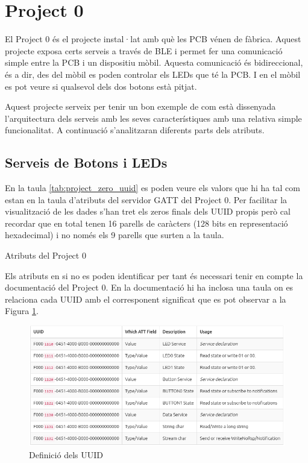 \section{Project 0}
El Project 0 és el projecte instal·lat amb què les PCB vénen de fàbrica.
Aquest projecte exposa certs serveis a través de BLE i permet fer una comunicació simple entre la PCB i un dispositiu mòbil.
Aquesta comunicació és bidireccional, és a dir, des del mòbil es poden controlar els LEDs que té la PCB.
I en el mòbil es pot veure si qualsevol dels dos botons està pitjat.

Aquest projecte serveix per tenir un bon exemple de com està dissenyada l'arquitectura dels serveis amb les seves característiques amb una relativa simple funcionalitat. A continuació s'analitzaran diferents parts dels atributs.

\subsection{Serveis de Botons i LEDs}

En la taula \ref{tab:project_zero_uuid} es poden veure els valors que hi ha tal com estan en la taula d'atributs del servidor GATT del Project 0.
Per facilitar la visualització de les dades s'han tret els zeros finals dels UUID propis però cal recordar que en total tenen 16 parells de caràcters (128 bits en representació hexadecimal) i no només els 9 parells que surten a la taula.
\begin{table}[h!]
	\begin{center}
		\caption{Atributs del Project 0}
		\label{tab:project_zero_uuid}
	\end{center}
\end{table}
Els atributs en si no es poden identificar per tant és necessari tenir en compte la documentació del Project 0.
En la documentació hi ha inclosa una taula on es relaciona cada UUID amb el corresponent significat que es pot observar a la Figura \ref{project0_table}.

\begin{figure}[h!]
	\begin{center}
		\includegraphics[width=\textwidth]{./images/Project_0_UUID.png}
		\caption{Definició dels UUID \cite{project0_UUIDs}}
		\label{project0_table}
	\end{center}
\end{figure}

